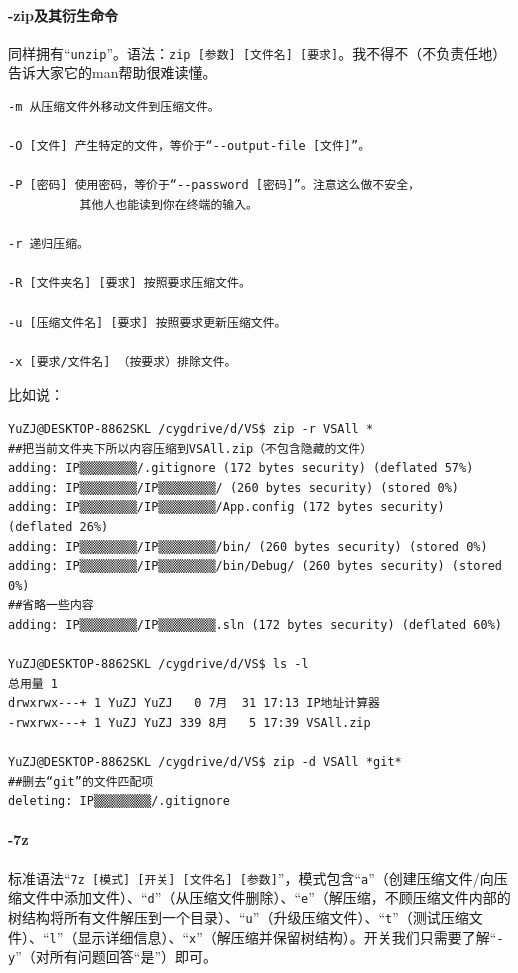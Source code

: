 \paragraph{-zip及其衍生命令}
同样拥有“\verb|unzip|”。语法：\verb|zip [参数] [文件名] [要求]|。我不得不（不负责任地）告诉大家它的man帮助很难读懂。\par
\begin{verbatim}
-m 从压缩文件外移动文件到压缩文件。

-O [文件] 产生特定的文件，等价于“--output-file [文件]”。

-P [密码] 使用密码，等价于“--password [密码]”。注意这么做不安全，
          其他人也能读到你在终端的输入。

-r 递归压缩。

-R [文件夹名] [要求] 按照要求压缩文件。

-u [压缩文件名] [要求] 按照要求更新压缩文件。

-x [要求/文件名] （按要求）排除文件。
\end{verbatim}\par
比如说：\par
\begin{verbatim}
YuZJ@DESKTOP-8862SKL /cygdrive/d/VS$ zip -r VSAll *
##把当前文件夹下所以内容压缩到VSAll.zip（不包含隐藏的文件）
adding: IP▒▒ַ▒▒▒▒▒▒/.gitignore (172 bytes security) (deflated 57%)
adding: IP▒▒ַ▒▒▒▒▒▒/IP▒▒ַ▒▒▒▒▒▒/ (260 bytes security) (stored 0%)
adding: IP▒▒ַ▒▒▒▒▒▒/IP▒▒ַ▒▒▒▒▒▒/App.config (172 bytes security) (deflated 26%)
adding: IP▒▒ַ▒▒▒▒▒▒/IP▒▒ַ▒▒▒▒▒▒/bin/ (260 bytes security) (stored 0%)
adding: IP▒▒ַ▒▒▒▒▒▒/IP▒▒ַ▒▒▒▒▒▒/bin/Debug/ (260 bytes security) (stored 0%)
##省略一些内容
adding: IP▒▒ַ▒▒▒▒▒▒/IP▒▒ַ▒▒▒▒▒▒.sln (172 bytes security) (deflated 60%)

YuZJ@DESKTOP-8862SKL /cygdrive/d/VS$ ls -l
总用量 1
drwxrwx---+ 1 YuZJ YuZJ   0 7月  31 17:13 IP地址计算器
-rwxrwx---+ 1 YuZJ YuZJ 339 8月   5 17:39 VSAll.zip

YuZJ@DESKTOP-8862SKL /cygdrive/d/VS$ zip -d VSAll *git*
##删去“git”的文件匹配项
deleting: IP▒▒ַ▒▒▒▒▒▒/.gitignore
\end{verbatim}
\paragraph{-7z}
标准语法“\verb|7z [模式] [开关] [文件名] [参数]|”，模式包含“\verb|a|”（创建压缩文件/向压缩文件中添加文件）、“\verb|d|”（从压缩文件删除）、“\verb|e|”（解压缩，不顾压缩文件内部的树结构将所有文件解压到一个目录）、“\verb|u|”（升级压缩文件）、“\verb|t|”（测试压缩文件）、“\verb|l|”（显示详细信息）、“\verb|x|”（解压缩并保留树结构）。开关我们只需要了解“\verb|-y|”（对所有问题回答“是”）即可。
